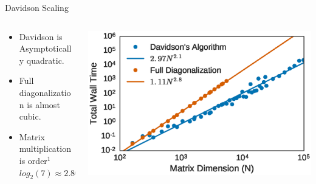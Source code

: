 \documentclass[10pt]{beamer}
\begin{document}
{{{{{{{{{{{{{{{{{{\begin{frame}{Davidson Scaling}
	\begin{columns}[c] %
		\begin{column}{.4\textwidth}
			\begin{itemize}
				\item {Davidson is Asymptotically quadratic.}
				\item {Full diagonalization is almost cubic.}
				\item {Matrix multiplication is order${}^1$ $log_2(7) \approx 2.807$}
			\end{itemize}				
		\end{column}
		\hfill
		\begin{column}{0.6\textwidth}
		    \begin{overprint}
			    \includegraphics[width=\linewidth]{../images/dav_vs_exact_scaling.eps}

			\end{overprint}
		\end{column}	
	\end{columns}
\end{frame}

}}}}}}}}}}}}}}}}}}
\end{document}
